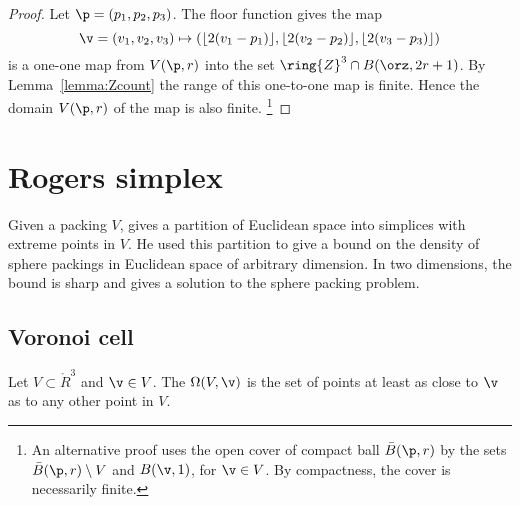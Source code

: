 \begin{proof}  Let $\p = (p_1,p_2,p_3)$. The floor function gives the map
\begin{displaymath}\v=(v_1,v_2,v_3)\mapsto (\lfloor 2(v_1-p_1)
  \rfloor, \lfloor 2(v_2-p_2) \rfloor, \lfloor 2(v_3-p_3) \rfloor)\end{displaymath}
is a one-one map from $ V(\p,r)$ into the set $\ring{Z}^3\cap B(\orz,2r + 1)$.  
By Lemma~\ref{lemma:Zcount} the range of this one-to-one map is finite. 
Hence the domain $ V(\p,r)$ of the map is also finite.%
\footnote{An alternative proof uses the open cover of compact ball 
$\bar B(\p,r)$ by the sets $\bar B(\p,r)\setminus V$ and $B(\v,1)$, 
for $\v\in V$. By compactness, the cover is necessarily finite.}
\end{proof}
%




\section{Rogers simplex}\label{sec:rogers}





Given a packing $ V$, \cite{Rogers:1958:Packing} gives a partition of
Euclidean space into simplices with extreme points in $ V$.  He used
this partition to give a bound on the density of sphere packings in
Euclidean space of arbitrary dimension.  In two dimensions, the bound
is sharp and gives a solution to the sphere packing problem.


\subsection{Voronoi cell}

\begin{definition}\label{def:voronoi}
Let $V\subset\ring{R}^3$ and $\v\in V$.
The  
$\Omega(V,\v)$
is the set of points at least as close to $\v$ as to
any other point in $V$. 
\end{definition}

